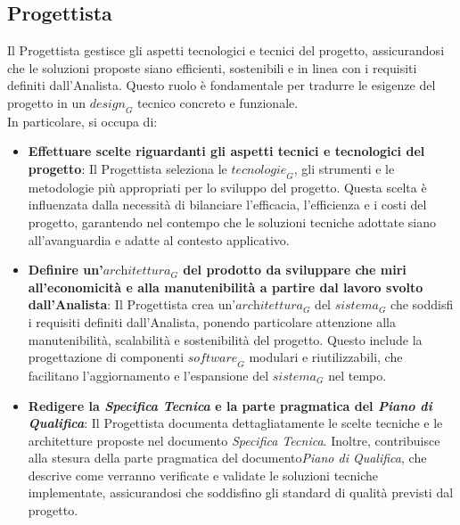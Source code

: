\subsection{Progettista}
Il Progettista gestisce gli aspetti tecnologici e tecnici del progetto, assicurandosi che le soluzioni proposte siano efficienti, sostenibili e in linea con i requisiti definiti dall'Analista. Questo ruolo è fondamentale per tradurre le esigenze del progetto in un $\textit{design}_G$ tecnico concreto e funzionale.\\
In particolare, si occupa di:
\begin{itemize}
    \item \textbf{Effettuare scelte riguardanti gli aspetti tecnici e tecnologici del progetto}: Il Progettista seleziona le $\textit{tecnologie}_G$, gli strumenti e le metodologie più appropriati per lo sviluppo del progetto. Questa scelta è influenzata dalla necessità di bilanciare l'efficacia, l'efficienza e i costi del progetto, garantendo nel contempo che le soluzioni tecniche adottate siano all'avanguardia e adatte al contesto applicativo.
    \item \textbf{Definire un'$\textit{architettura}_G$ del prodotto da sviluppare che miri all'economicità e alla manutenibilità a partire dal lavoro svolto dall'Analista}: Il Progettista crea un'$\textit{architettura}_G$ del $\textit{sistema}_G$ che soddisfi i requisiti definiti dall'Analista, ponendo particolare attenzione alla manutenibilità, scalabilità e sostenibilità del progetto. Questo include la progettazione di componenti $\textit{software}_G$ modulari e riutilizzabili, che facilitano l'aggiornamento e l'espansione del $\textit{sistema}_G$ nel tempo.
    \item \textbf{Redigere la \textit{Specifica Tecnica} e la parte pragmatica del \textit{Piano di Qualifica}}: Il Progettista documenta dettagliatamente le scelte tecniche e le architetture proposte nel documento \textit{Specifica Tecnica}. Inoltre, contribuisce alla stesura della parte pragmatica del documento\textit{Piano di Qualifica}, che descrive come verranno verificate e validate le soluzioni tecniche implementate, assicurandosi che soddisfino gli standard di qualità previsti dal progetto.
\end{itemize}

